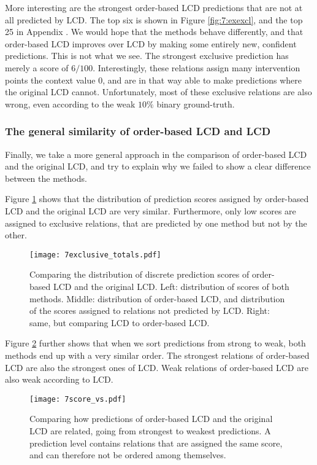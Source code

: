 More interesting are the strongest order-based LCD predictions that are not at all predicted by LCD. The top six is shown in Figure \ref{fig:7:exexcl}, and the top 25 in Appendix . We would hope that the methods behave differently, and that order-based LCD improves over LCD by making some entirely new, confident predictions. This is not what we see. The strongest exclusive prediction has merely a score of $6/100$. Interestingly, these relations assign many intervention points the context value $0$, and are in that way able to make predictions where the original LCD cannot. Unfortunately, most of these exclusive relations are also wrong, even according to the weak $10\%$ binary ground-truth. 


\subsubsection{The general similarity of order-based LCD and LCD}

Finally, we take a more general approach in the comparison of order-based LCD and the original LCD, and try to explain why we failed to show a clear difference between the methods. 

Figure \ref{fig:7:excltotals} shows that the distribution of prediction scores assigned by order-based LCD and the original LCD are very similar. Furthermore, only low scores are assigned to exclusive relations, that are predicted by one method but not by the other. 

\begin{figure}[h]
    \centering
    \texttt{[image: 7exclusive\_totals.pdf]}
    \caption{Comparing the distribution of discrete prediction scores of order-based LCD and the original LCD. Left: distribution of scores of both methods. Middle: distribution of order-based LCD, and distribution of the scores assigned to relations not predicted by LCD. Right: same, but comparing LCD to order-based LCD.}
    \label{fig:7:excltotals}
\end{figure}

Figure \ref{fig:7:scorevs} further shows that when we sort predictions from strong to weak, both methods end up with a very similar order. The strongest relations of order-based LCD are also the strongest ones of LCD. Weak relations of order-based LCD are also weak according to LCD. 

\begin{figure}[h]
    \centering
    \texttt{[image: 7score\_vs.pdf]}
    \caption{Comparing how predictions of order-based LCD and the original LCD are related, going from strongest to weakest predictions. A prediction level contains relations that are assigned the same score, and can therefore not be ordered among themselves.}
    \label{fig:7:scorevs}
\end{figure}

